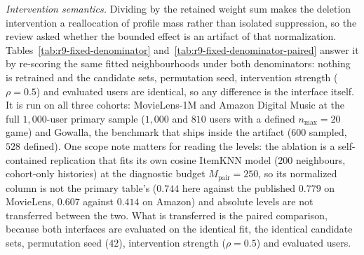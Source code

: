 \documentclass[manuscript,screen,anonymous]{acmart}
\begin{document}
\emph{Intervention semantics.} Dividing by the retained weight sum makes
the deletion intervention a reallocation of profile mass rather than isolated
suppression, so the review asked whether the bounded effect is an artifact of that
normalization. Tables~\ref{tab:r9-fixed-denominator}
and~\ref{tab:r9-fixed-denominator-paired} answer it by re-scoring the same fitted
neighbourhoods under both denominators: nothing is retrained and the candidate sets,
permutation seed, intervention strength ($\rho=0.5$) and evaluated users are
identical, so any difference is the interface itself. It is run on all three cohorts: MovieLens-1M and
Amazon Digital Music at the full $1{,}000$-user primary sample ($1{,}000$ and $810$
users with a defined $n_{\max}=20$ game) and Gowalla, the benchmark that ships inside
the artifact ($600$ sampled, $528$ defined). One scope note matters for reading the
levels: the ablation is a self-contained replication that fits its own cosine ItemKNN
model ($200$ neighbours, cohort-only histories) at the diagnostic budget
$M_{\mathrm{pair}}=250$, so its normalized column is not the primary table's
($0.744$ here against the published $0.779$ on MovieLens, $0.607$ against $0.414$ on
Amazon) and absolute levels are not transferred between the two. What is transferred is
the paired comparison, because both interfaces are evaluated on the identical fit, the
identical candidate sets, permutation seed ($42$), intervention strength
($\rho=0.5$) and evaluated users.
\end{document}
